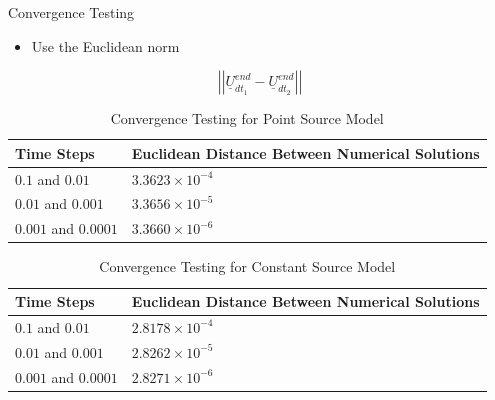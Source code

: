 \documentclass[10pt]{beamer}
\begin{document}
\begin{frame} {Convergence Testing} \label{ConvergenceTesting}

\begin{itemize}
\item Use the Euclidean norm
\end{itemize}
\begin{equation}
\left|\left| \underline{U}^{end}_{dt_{1}}-\underline{U}^{end}_{dt_{2}} \right|\right|
\end{equation}

\begin{table}
\centering
\caption{Convergence Testing for Point Source Model}

\begin{tabular}{|l|l|}
\hline
Time Steps           & Euclidean Distance Between Numerical Solutions \\ \hline
$0.1$ and $0.01$     & $3.3623 \times 10^{-4}$              \\ \hline
$0.01$ and $0.001$   & $3.3656 \times 10^{-5}$              \\ \hline
$0.001$ and $0.0001$ & $3.3660 \times 10^{-6}$                                    \\ \hline
\end{tabular}
\end{table}

\begin{table}
\centering
\caption{Convergence Testing for Constant Source Model}

\begin{tabular}{|l|l|}
\hline
Time Steps           & Euclidean Distance Between Numerical Solutions \\ \hline
$0.1$ and $0.01$     & $2.8178 \times 10^{-4}$              \\ \hline
$0.01$ and $0.001$   & $2.8262 \times 10^{-5}$              \\ \hline
$0.001$ and $0.0001$ & $2.8271 \times 10^{-6}$                                      \\ \hline
\end{tabular}
\end{table}

\hyperlink{Questions}{}
\end{frame}
\end{document}
